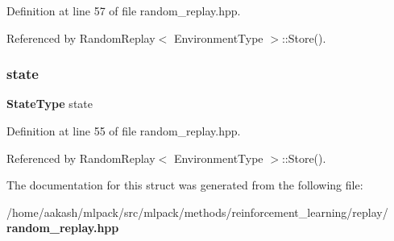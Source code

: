 Definition at line 57 of file random\+\_\+replay.\+hpp.



Referenced by Random\+Replay$<$ Environment\+Type $>$\+::\+Store().

\mbox{\label{structmlpack_1_1rl_1_1RandomReplay_1_1Transition_a4d1aa26dcfa648e02cbb0964cddbdbfe}} 
\subsubsection{state}
{\footnotesize\ttfamily \textbf{ State\+Type} state}



Definition at line 55 of file random\+\_\+replay.\+hpp.



Referenced by Random\+Replay$<$ Environment\+Type $>$\+::\+Store().



The documentation for this struct was generated from the following file\+:\begin{DoxyCompactItemize}
\item 
/home/aakash/mlpack/src/mlpack/methods/reinforcement\+\_\+learning/replay/\textbf{ random\+\_\+replay.\+hpp}\end{DoxyCompactItemize}
